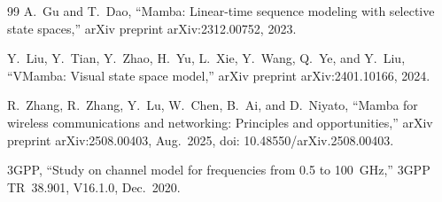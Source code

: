 \documentclass[conference]{IEEEtran}
\begin{document}
\begin{thebibliography}{99}
A.~Gu and T.~Dao,
``Mamba: Linear-time sequence modeling with selective state spaces,''
arXiv preprint arXiv:2312.00752, 2023.

Y.~Liu, Y.~Tian, Y.~Zhao, H.~Yu, L.~Xie, Y.~Wang, Q.~Ye, and Y.~Liu,
``VMamba: Visual state space model,''
arXiv preprint arXiv:2401.10166, 2024.

R.~Zhang, R.~Zhang, Y.~Lu, W.~Chen, B.~Ai, and D.~Niyato,
``Mamba for wireless communications and networking: Principles and opportunities,''
arXiv preprint arXiv:2508.00403, Aug.~2025, doi: 10.48550/arXiv.2508.00403.

3GPP,
``Study on channel model for frequencies from 0.5 to 100~GHz,''
3GPP TR~38.901, V16.1.0, Dec.~2020.

\end{thebibliography}
\end{document}
